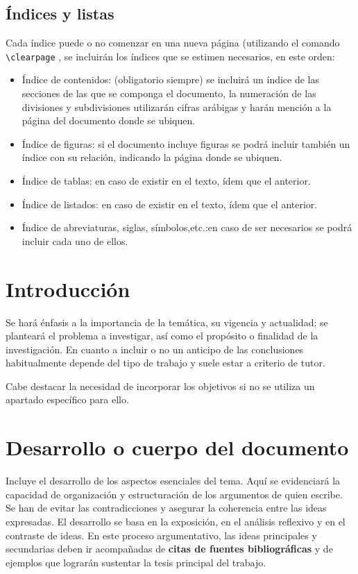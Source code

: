  \subsection{Índices y listas}

Cada índice puede o no  comenzar en una nueva página (utilizando el comando  \lstinline[language=enparrafo]!\clearpage! , se incluirán los índices que se estimen necesarios, en este orden:

\begin{itemize}
    \item Índice de contenidos: (obligatorio  siempre)  se  incluirá  un  índice  de  las secciones  de  las  que  se  componga  el  documento,  la  numeración  de las divisiones  y  subdivisiones  utilizarán  cifras  arábigas y harán mención a la página del documento donde se ubiquen.
    
\item Índice de figuras: si el documento incluye figuras se podrá incluir también un índice con su relación, indicando la página donde se ubiquen.

\item Índice de tablas: en caso de existir en el texto, ídem que el anterior.

\item Índice de listados: en caso de existir en el texto, ídem que el anterior.

\item Índice de abreviaturas, siglas, símbolos,etc.:en  caso  de  ser  necesarios  se podrá incluir cada uno de ellos.

\end{itemize}

 \section{Introducción}
Se hará énfasis a la importancia de la temática, su vigencia y  actualidad;  se  planteará  el  problema  a  investigar,  así  como  el  propósito  o finalidad de la investigación. En cuanto a incluir o no un anticipo de las conclusiones habitualmente depende del tipo de trabajo y suele estar a criterio de tutor.

Cabe destacar la necesidad de incorporar los objetivos si no se utiliza un apartado específico para ello.

 \section{Desarrollo o cuerpo del documento}
Incluye   el  desarrollo  de  los  aspectos  esenciales  del  tema.  Aquí  se  evidenciará la capacidad de organización y estructuración de los argumentos de quien escribe. Se han de evitar las contradicciones y asegurar la coherencia entre las ideas expresadas. El desarrollo se  basa  en  la  exposición,  en  el  análisis  reflexivo  y  en  el  contraste  de  ideas.  En  este  proceso  argumentativo,  las  ideas  principales  y  secundarias  deben  ir  acompañadas  de  \textbf{citas  de  fuentes  bibliográficas} y de ejemplos que lograrán sustentar la tesis principal del trabajo. 


